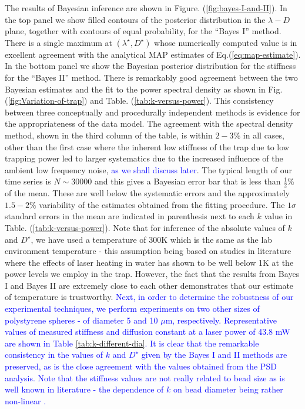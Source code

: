 \documentclass[fleqn,10pt]{wlscirep}
\begin{document}
The results of Bayesian inference are shown in Figure. (\ref{fig:bayes-I-and-II}).
In the top panel we show filled contours of the posterior distribution
in the $\lambda-D$ plane, together with contours of equal probability,
for the ``Bayes I'' method. There is a single maximum at $(\lambda^{\star},D^{\star})$
whose numerically computed value is in excellent agreement with the
analytical MAP estimates of Eq.(\ref{eq:map-estimate}). In the bottom
panel we show the Bayesian posterior distribution for the stiffness
for the ``Bayes II'' method. There is remarkably good agreement
between the two Bayesian estimates and the fit to the power spectral
density as shown in Fig. (\ref{fig:Variation-of-trap}) and Table.
(\ref{tab:k-versus-power}). This consistency between three conceptually
and procedurally independent methods is evidence for the appropriateness
of the data model. The agreement with the spectral density method,
shown in the third column of the table, is within $2-3\%$ in all
cases, other than the first case where the inherent low stiffness
of the trap due to low trapping power led to larger systematics due
to the increased influence of the ambient low frequency noise, \textcolor{blue}{as
we shall discuss later}. The typical length of our time series is
$N\sim30000$ and this gives a Bayesian error bar that is less than
$\frac{1}{2}$\% of the mean. These are well below the systematic
errors and the approximately $1.5-2\%$ variability of the estimates
obtained from the fitting procedure. The $1\sigma$ standard errors
in the mean are indicated in parenthesis next to each $k$ value in
Table. (\ref{tab:k-versus-power}). Note that for inference of the
absolute values of $k$ and $D^{\star}$, we have used a temperature
of 300K which is the same as the lab environment temperature -
this assumption being based on studies in literature \cite{schmidt03heating}where
the effects of laser heating in water has shown to be well below 1K
at the power levels we employ in the trap. However, the fact that
the results from Bayes I and Bayes II are extremely close to each
other demonstrates that our estimate of temperature is trustworthy.
\textcolor{blue}{Next, in order to determine the robustness of our
experimental techniques, we perform experiments on two other sizes
of polystyrene spheres - of diameter 5 and 10 $\mu$m, respectively.
Representative values of measured stiffness and diffusion constant
at a laser power of 43.8 mW are shown in Table \ref{tab:k-different-dia}.
It is clear that the remarkable consistency in the values of $k$
and $D^{\star}$ given by the Bayes I and II methods are preserved,
as is the close agreement with the values obtained from the PSD analysis.
Note that the stiffness values are not really related to bead size
as is well known in literature - the dependence of $k$ on bead diameter
being rather non-linear \cite{simmonsbeadstiff96}. }
\end{document}
